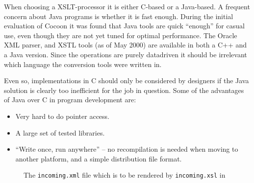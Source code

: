 

      

      

When choosing a XSLT-processor it is either C-based or a Java-based.
A frequent concern about Java programs is whether it is fast enough.
During the initial evaluation of Cocoon it was found that Java tools
are quick ``enough'' for casual use, even though they are not yet
tuned for optimal performance.  The Oracle XML parser, and XSTL tools
(as of May 2000) are available in both a C++ and a Java version.
Since the operations are purely datadriven it should be irrelevant
which language the conversion tools were written in.

Even so, implementations in C should only be considered by designers
if the Java solution is clearly too inefficient for the job in
question.  Some of the advantages of Java over C in program
development are:

\begin{itemize}
\item Very hard to do pointer access.
\item A large set of tested libraries.
\item ``Write once, run anywhere'' -- no recompilation is needed when
  moving to another platform, and a simple distribution file format.
\end{itemize}

\begin{figure}[tbp]
  \begin{center}
    \caption{The \texttt{incoming.xml} file which is to be rendered by
      \texttt{incoming.xsl} in
      } 
    \label{fig:src-public_html-incoming.xml}
  \end{center}
\end{figure}


